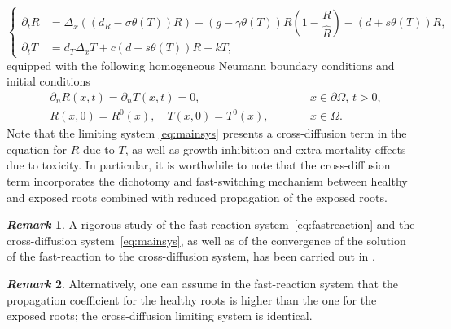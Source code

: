 \documentclass[11pt]{elsarticle}
\theoremstyle{plain}
\theoremstyle{definition}
\theoremstyle{myremark}
\newtheorem*{remark}{\textit{Remark}}
\begin{document}
\begin{equation} \label{eq:mainsys}
\begin{cases}
\partial_t R&= \Delta_x \left(\left(d_R -\sigma \theta(T)\right)R\right)
+\left(g-\gamma \theta(T)\right)R\left(1-\dfrac{R}{\hat{R}}\right)
-\left(d+s\theta(T)\right)R,\\[0.3cm]
\partial_t T&= d_T \Delta_x T +c\left(d+s\theta(T)\right)R-kT,
\end{cases}
\end{equation}
equipped with the following homogeneous Neumann boundary conditions and initial conditions
\begin{equation} \label{eq:BICfr}
\begin{aligned}
    &\partial_n R(x,t) = \partial_n T(x,t) = 0, \qquad &&x \in \partial \Omega, \, t>0, \\
    &R(x,0) = R^0(x), \quad T(x,0) = T^0(x), \qquad &&x \in \Omega.
\end{aligned}
\end{equation}
Note that the limiting system \eqref{eq:mainsys} presents a cross-diffusion term in the equation for $R$ due to $T$, as well as growth-inhibition and extra-mortality effects due to toxicity. In particular, it is worthwhile to note that the cross-diffusion term incorporates the dichotomy and fast-switching mechanism between healthy and exposed roots combined with reduced propagation of the exposed roots.

\begin{remark}
    A rigorous study of the fast-reaction system~\eqref{eq:fastreaction} and the cross-diffusion system~\eqref{eq:mainsys}, as well as of the convergence of the solution of the fast-reaction to the cross-diffusion system, has been carried out in \cite{morgan2024singular}.
\end{remark} 

\begin{remark}
    Alternatively, one can assume in the fast-reaction system that the propagation coefficient for the healthy roots is higher than the one for the exposed roots; the cross-diffusion limiting system is identical.
\end{remark} 
\end{document}
